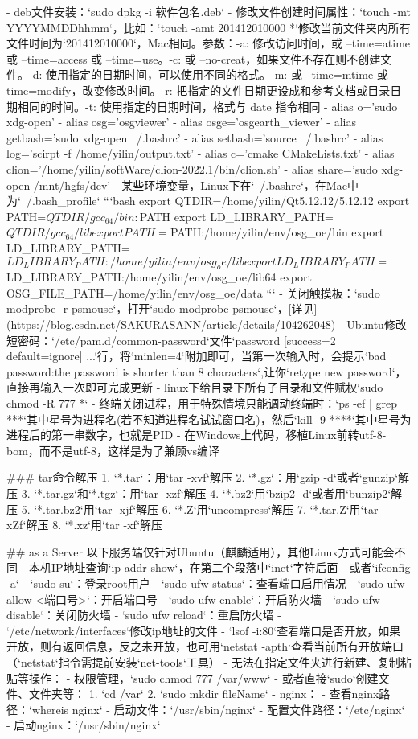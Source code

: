 - deb文件安装：`sudo dpkg -i 软件包名.deb`
- 修改文件创建时间属性：`touch -mt YYYYMMDDhhmm`，比如：`touch -amt 201412010000 *`修改当前文件夹内所有文件时间为`201412010000`，Mac相同。参数：-a: 修改访问时间，或 –time=atime 或 –time=access 或 –time=use。-c: 或 –no-creat，如果文件不存在则不创建文件。-d: 使用指定的日期时间，可以使用不同的格式。-m: 或 –time=mtime 或 –time=modify，改变修改时间。-r: 把指定的文件日期更设成和参考文档或目录日期相同的时间。-t: 使用指定的日期时间，格式与 date 指令相同
- alias o='sudo xdg-open'
- alias osg='osgviewer'
- alias osge='osgearth_viewer'
- alias getbash='sudo xdg-open ~/.bashrc'
- alias setbash='source ~/.bashrc'
- alias log='scirpt -f /home/yilin/output.txt'
- alias c='cmake CMakeLists.txt'
- alias clion='/home/yilin/softWare/clion-2022.1/bin/clion.sh'
- alias share='sudo xdg-open /mnt/hgfs/dev'
- 某些环境变量，Linux下在`~/.bashrc`，在Mac中为`~/.bash_profile`
  ```bash
  export QTDIR=/home/yilin/Qt5.12.12/5.12.12
  export PATH=$QTDIR/gcc_64/bin:$PATH
  export LD_LIBRARY_PATH=$QTDIR/gcc_64/lib
  
  export PATH=${PATH}:/home/yilin/env/osg_oe/bin
  export LD_LIBRARY_PATH=${LD_LIBRARY_PATH}:/home/yilin/env/osg_oe/lib
  export LD_LIBRARY_PATH=${LD_LIBRARY_PATH}:/home/yilin/env/osg_oe/lib64
  export OSG_FILE_PATH=/home/yilin/env/osg_oe/data
  ```
- 关闭触摸板：`sudo modprobe -r psmouse`，打开`sudo modprobe psmouse`，[详见](https://blog.csdn.net/SAKURASANN/article/details/104262048)
- Ubuntu修改短密码：`/etc/pam.d/common-password`文件`password	[success=2 default=ignore]	...`行，将`minlen=4`附加即可，当第一次输入时，会提示`bad password:the password is shorter than 8 characters`,让你`retype new password`，直接再输入一次即可完成更新
- linux下给目录下所有子目录和文件赋权`sudo chmod -R 777 *`
- 终端关闭进程，用于特殊情境只能调动终端时：`ps -ef | grep ***`其中星号为进程名(若不知道进程名试试窗口名)，然后`kill -9 ****`其中星号为进程后的第一串数字，也就是PID
- 在Windows上代码，移植Linux前转utf-8-bom，而不是utf-8，这样是为了兼顾vs编译

### tar命令解压
1. `*.tar`：用`tar -xvf`解压
2. `*.gz`：用`gzip -d`或者`gunzip`解压
3. `*.tar.gz`和`*.tgz`：用`tar -xzf`解压
4. `*.bz2`用`bzip2 -d`或者用`bunzip2`解压
5. `*.tar.bz2`用`tar -xjf`解压
6. `*.Z`用`uncompress`解压
7. `*.tar.Z`用`tar -xZf`解压
8. `*.xz`用`tar -xf`解压


## as a Server
以下服务端仅针对Ubuntu（麒麟适用），其他Linux方式可能会不同
- 本机IP地址查询`ip addr show`，在第二个段落中`inet`字符后面
- 或者`ifconfig -a`
- `sudo su`：登录root用户
- `sudo ufw status`：查看端口启用情况
- `sudo ufw allow <端口号>`：开启端口号
- `sudo ufw enable`：开启防火墙
- `sudo ufw disable`：关闭防火墙
- `sudo ufw reload`：重启防火墙
- `/etc/network/interfaces`修改ip地址的文件
- `lsof -i:80`查看端口是否开放，如果开放，则有返回信息，反之未开放，也可用`netstat -apth`查看当前所有开放端口（`netstat`指令需提前安装`net-tools`工具）
- 无法在指定文件夹进行新建、复制粘贴等操作：
    - 权限管理，`sudo chmod 777 /var/www`
    - 或者直接`sudo`创建文件、文件夹等：
        1. `cd /var`
        2. `sudo mkdir fileName`
- nginx：
    - 查看nginx路径：`whereis nginx`
    - 启动文件：`/usr/sbin/nginx`
    - 配置文件路径：`/etc/nginx`
    - 启动nginx：`/usr/sbin/nginx`

